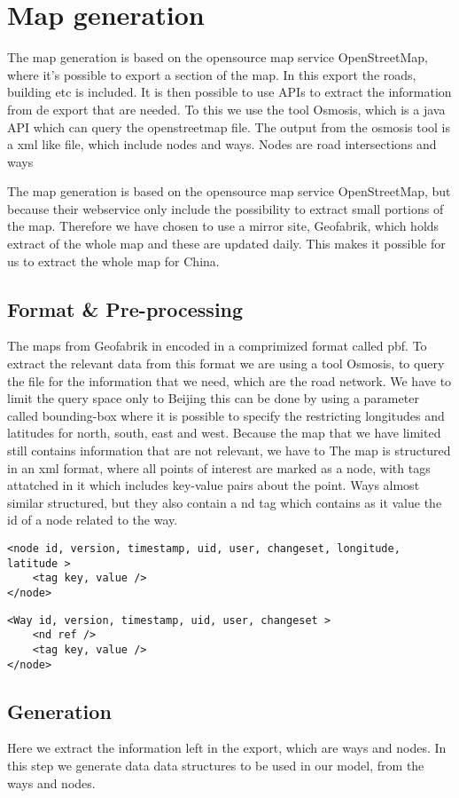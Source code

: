 \section{Map generation}
The map generation is based on the opensource map service OpenStreetMap, where it's possible to export a section of the map. In this export the roads, building etc is included. It is then possible to use APIs to extract the information from de export that are needed. To this we use the tool Osmosis, which is a java API which can query the openstreetmap file.
The output from the osmosis tool is a xml like file, which include nodes and ways. Nodes are road intersections and ways 

The map generation is based on the opensource map service OpenStreetMap, but because their webservice only include the possibility to extract small portions of the map.
Therefore we have chosen to use a mirror site, Geofabrik, which holds extract of the whole map and these are updated daily. This makes it possible for us to extract the whole map for China.

\subsection{Format & Pre-processing}
The maps from Geofabrik in encoded in a comprimized format called pbf. To extract the relevant data from this format we are using a tool Osmosis, to query the file for the information that we need, which are the road network.
We have to limit the query space only to Beijing this can be done by using a parameter called bounding-box where it is possible to specify the restricting longitudes and latitudes for north, south, east and west.
Because the map that we have limited still contains information that are not relevant, we have to 
The map is structured in an xml format, where all points of interest are marked as a node, with tags attatched in it which includes key-value pairs about the point.
Ways almost similar structured, but they also contain a nd tag which contains as it value the id of a node related to the way. 

\begin{lstlisting}[style=XML, caption=Node representation]
<node id, version, timestamp, uid, user, changeset, longitude, latitude >
	<tag key, value />
</node>
\end{lstlisting}

\begin{lstlisting}[style=XML, caption=Way representation]
<Way id, version, timestamp, uid, user, changeset >
	<nd ref />
	<tag key, value />
</node>
\end{lstlisting}

\subsection{Generation}
Here we extract the information left in the export, which are ways and nodes. In this step we generate data data structures to be used in our model, from the ways and nodes. 